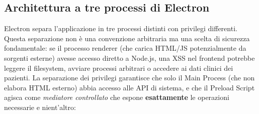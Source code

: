\documentclass[a4paper,12pt]{article}
\begin{document}
\subsection{Architettura a tre processi di Electron}

Electron separa l'applicazione in tre processi distinti con privilegi
differenti. Questa separazione non \`{e} una convenzione arbitraria ma
una scelta di sicurezza fondamentale: se il processo renderer (che carica
HTML/JS potenzialmente da sorgenti esterne) avesse accesso diretto a
Node.js, una XSS nel frontend potrebbe leggere il filesystem, avviare
processi arbitrari o accedere ai dati clinici dei pazienti. La separazione
dei privilegi garantisce che solo il Main Process (che non elabora HTML
esterno) abbia accesso alle API di sistema, e che il Preload Script agisca
come \textit{mediatore controllato} che espone \textbf{esattamente} le
operazioni necessarie e nient'altro:
\end{document}
